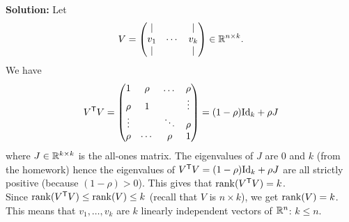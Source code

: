 \documentclass[11pt,nocut]{article}
\begin{document}
\textbf{Solution:}
Let
$$
V=
\begin{pmatrix}
	| & & | \\
	v_1 & \cdots & v_k \\
	| & & | 
\end{pmatrix}
\in \mathbb{R}^{n \times k}.
$$
We have
$$
V^{{\sf T}} V =
\begin{pmatrix}
	1 & \rho & \dots & \rho \\
	\rho & 1 & & \vdots \\
	\vdots &  & \ddots & \rho \\
	\rho & \cdots & \rho & 1 \\
\end{pmatrix}
= (1-\rho) {{\rm Id}}_k + \rho J
$$
where $J\in \mathbb{R}^{k \times k}$ is the all-ones matrix. The eigenvalues of $J$ are $0$ and $k$ (from the homework) hence the eigenvalues of $V^{{\sf T}} V = (1-\rho) {{\rm Id}}_k + \rho J$ are all strictly positive (because $(1-\rho) > 0$). This gives that ${{\rm rank}}(V^{{\sf T}}V) = k$.
\\

Since ${{\rm rank}}(V^{{\sf T}} V) \leq {{\rm rank}}(V) \leq k$ (recall that $V$ is $n \times k$), we get ${{\rm rank}}(V) = k$. This means that $v_1, \dots, v_k$ are $k$ linearly independent vectors of $\mathbb{R}^n$: $k \leq n$.




\vspace{1cm}
\centerline{}

%
%
\end{document}
